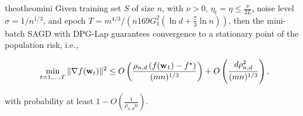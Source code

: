 \documentclass[11pt]{article}
\begin{document}

\begin{restatable}{theo}{theomini}
\label{thm: main_rmsprop_mini}
 Given training set $S$ of size $n$, with $\nu >0$, $\eta_t = \eta \leq \frac{\nu}{2L}$, noise level $\sigma = 1/n^{1/3}$, and epoch $T = m^{4/3}/\left(n169G_1^2(\ln d + \frac{7}{3}\ln n)\right)$, then the mini-batch SAGD with DPG-Lap  guarantees convergence to a stationary point of the population risk, i.e., 
 \begin{small}
\begin{equation*}
\begin{split}
 \min_{t = 1,..., T}\|\nabla f(\mathbf{w}_t)\|^2 
 \leq O\left( \frac{\rho_{n,d} \left(f(\mathbf{w}_1) - f^\star \right)}{(mn)^{1/3}} \right)+ O \left( \frac{d \rho_{n,d}^2}{(mn)^{1/3}}\right),
 \end{split}
\end{equation*}
\end{small}
with probability at least $1-O\left(\frac{1}{\rho_{n,d} n}\right)$.
\end{restatable}
\end{document}
